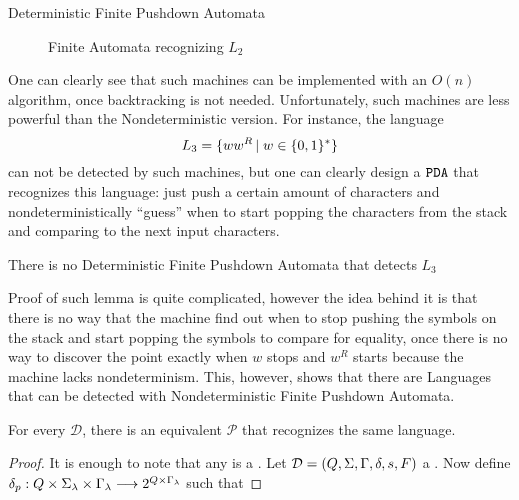 \begin{section}{Deterministic Finite Pushdown Automata}
\begin{figure}

\caption{Finite Automata recognizing $L_2$}
\label{fig:pushdown_automata}
\end{figure}

One can clearly see that such machines can be implemented with an $O(n)$ algorithm,
once backtracking is not needed. Unfortunately, such machines are less powerful
than the Nondeterministic version. For instance, the language
$$L_3 = \{ww^R\,|\;w \in \{0, 1\}^*\}$$
can not be detected by such machines, but one can clearly design a $\texttt{PDA}$
that recognizes this language: just push a certain amount of characters
and nondeterministically ``guess'' when to start popping the characters
from the stack and comparing to the next input characters.

\begin{lemma}\label{lemma:pushdown_1}
	There is no Deterministic Finite Pushdown Automata that detects $L_3$
\end{lemma}
Proof of such lemma is quite complicated, however the idea behind it is that
there is no way that the machine find out when to stop pushing the symbols
on the stack and start popping the symbols to compare for equality, once
there is no way to discover the point exactly when $w$ stops and $w^R$ starts
because the machine lacks nondeterminism. This, however, shows that there
are Languages that can be detected with Nondeterministic Finite Pushdown
Automata.

\begin{lemma}\label{lemma:pushdown_2}
	For every  $\mathcal{D}$, there is
	an equivalent  $\mathcal{P}$ that recognizes the
	same language.
\end{lemma}
\begin{proof}
	 It is enough to note that any  is a .  Let $\mathcal{D}
	 = (Q, \Sigma, \Gamma, \delta, s, F)$ a \DPDA. Now define
	 $\delta_p : Q\times\Sigma_\lambda\times\Gamma_\lambda \longrightarrow 2^{Q\times\Gamma_\lambda}$ such that


\end{proof}
\end{section}
